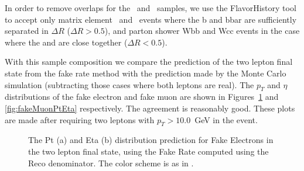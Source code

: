 \documentclass{cmspaper}
\begin{document}
In order to remove overlaps for the \W\ and \Z\ samples, we use the FlavorHistory tool \cite{FlavorHistory} to accept only matrix element \Wbb\ and \Wcc\ events where the b and bbar are sufficiently separated in $\Delta R$ ($\Delta R > 0.5$), and parton shower Wbb and Wcc events in the case where the \bottom and \bbar are close together ($\Delta R < 0.5$).

With this sample composition we compare the prediction of the two lepton final state from the fake rate method with the prediction made by the Monte Carlo simulation (subtracting those cases where both leptons are real). The $p_T$ and $\eta$ distributions of the fake electron and fake muon are shown in Figures~\ref{fig:fakeElectronPtEta} and \ref{fig:fakeMuonPtEta} respectively. The agreement is reasonably good. These plots are made after requiring two leptons with $p_T > 10.0$~GeV in the event.


\begin{figure}[htb]
  \begin{center}
    \caption{The Pt (a) and Eta (b) distribution prediction for Fake Electrons in the two lepton final state, using the Fake Rate computed using the Reco denominator. The color  scheme is as in .}
    \label{fig:fakeElectronPtEta}
  \end{center}
\end{figure}
\end{document}
